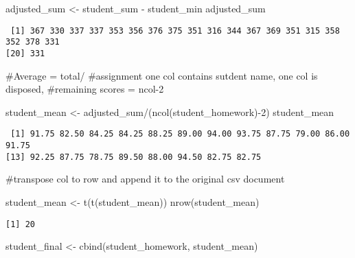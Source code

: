 \documentclass[
  letterpaper,
  DIV=11,
  numbers=noendperiod]{scrartcl}
\newenvironment{Shaded}{\begin{snugshade}}{\end{snugshade}}
\newcommand{\DecValTok}[1]{\textcolor[rgb]{0.68,0.00,0.00}{#1}}
\newcommand{\FunctionTok}[1]{\textcolor[rgb]{0.28,0.35,0.67}{#1}}
\newcommand{\NormalTok}[1]{\textcolor[rgb]{0.00,0.23,0.31}{#1}}
\newcommand{\OtherTok}[1]{\textcolor[rgb]{0.00,0.23,0.31}{#1}}
\newcommand{\SpecialCharTok}[1]{\textcolor[rgb]{0.37,0.37,0.37}{#1}}
\begin{document}
\begin{Shaded}
\begin{Highlighting}[]
\NormalTok{adjusted\_sum }\OtherTok{\textless{}{-}}\NormalTok{ student\_sum }\SpecialCharTok{{-}}\NormalTok{ student\_min}
\NormalTok{adjusted\_sum}
\end{Highlighting}
\end{Shaded}

\begin{verbatim}
 [1] 367 330 337 337 353 356 376 375 351 316 344 367 369 351 315 358 352 378 331
[20] 331
\end{verbatim}

\#Average = total/ \#assignment one col contains sutdent name, one col
is disposed, \#remaining scores = ncol-2

\begin{Shaded}
\begin{Highlighting}[]
\NormalTok{student\_mean }\OtherTok{\textless{}{-}}\NormalTok{ adjusted\_sum}\SpecialCharTok{/}\NormalTok{(}\FunctionTok{ncol}\NormalTok{(student\_homework)}\SpecialCharTok{{-}}\DecValTok{2}\NormalTok{)}
\NormalTok{student\_mean}
\end{Highlighting}
\end{Shaded}

\begin{verbatim}
 [1] 91.75 82.50 84.25 84.25 88.25 89.00 94.00 93.75 87.75 79.00 86.00 91.75
[13] 92.25 87.75 78.75 89.50 88.00 94.50 82.75 82.75
\end{verbatim}

\#transpose col to row and append it to the original csv document

\begin{Shaded}
\begin{Highlighting}[]
\NormalTok{student\_mean }\OtherTok{\textless{}{-}} \FunctionTok{t}\NormalTok{(}\FunctionTok{t}\NormalTok{(student\_mean))}
\FunctionTok{nrow}\NormalTok{(student\_mean)}
\end{Highlighting}
\end{Shaded}

\begin{verbatim}
[1] 20
\end{verbatim}

\begin{Shaded}
\begin{Highlighting}[]
\NormalTok{student\_final }\OtherTok{\textless{}{-}} \FunctionTok{cbind}\NormalTok{(student\_homework, student\_mean)}
\end{Highlighting}
\end{Shaded}
\end{document}
